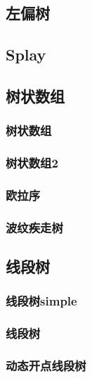 \subsection{左偏树}

\subsection{Splay}


\subsection{树状数组}
\subsubsection{树状数组}


\subsubsection{树状数组2}


\subsubsection{欧拉序}

\subsubsection{波纹疾走树}


\subsection{线段树}
\subsubsection{线段树simple}

\subsubsection{线段树}


\subsubsection{动态开点线段树}

